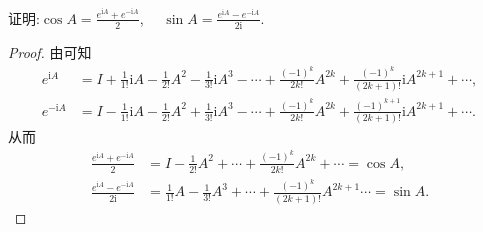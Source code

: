\documentclass[../../main.tex]{subfiles}
\begin{document}
\begin{theorem}\label{theorem:矩阵三角函数的一般表达式}
证明:$\cos A = \frac{e^{\mathrm{i}A}+e^{-\mathrm{i}A}}{2}$,$\quad$ $\sin A = \frac{e^{\mathrm{i}A}-e^{-\mathrm{i}A}}{2\mathrm{i}}$.
\end{theorem}
\begin{proof}
由可知
\begin{align*}
e^{\mathrm{i}A}&=I+\frac{1}{1!}\mathrm{i}A-\frac{1}{2!}A^2-\frac{1}{3!}\mathrm{i}A^3-\cdots +\frac{\left( -1 \right) ^k}{2k!}A^{2k}+\frac{\left( -1 \right) ^k}{\left( 2k+1 \right) !}\mathrm{i}A^{2k+1}+\cdots,\\
e^{-\mathrm{i}A}&=I-\frac{1}{1!}\mathrm{i}A-\frac{1}{2!}A^2+\frac{1}{3!}\mathrm{i}A^3-\cdots +\frac{\left( -1 \right) ^k}{2k!}A^{2k}+\frac{\left( -1 \right) ^{k+1}}{\left( 2k+1 \right) !}\mathrm{i}A^{2k+1}+\cdots.
\end{align*}
从而
\begin{align*}
\frac{e^{\mathrm{i}A}+e^{-\mathrm{i}A}}{2}&=I-\frac{1}{2!}A^2+\cdots +\frac{\left( -1 \right) ^k}{2k!}A^{2k}+\cdots =\cos A,\\
\frac{e^{\mathrm{i}A}-e^{-\mathrm{i}A}}{2\mathrm{i}}&=\frac{1}{1!}A-\frac{1}{3!}A^3+\cdots +\frac{\left( -1 \right) ^k}{\left( 2k+1 \right) !}A^{2k+1}\cdots =\sin A.
\end{align*}
\end{proof}
\end{document}
